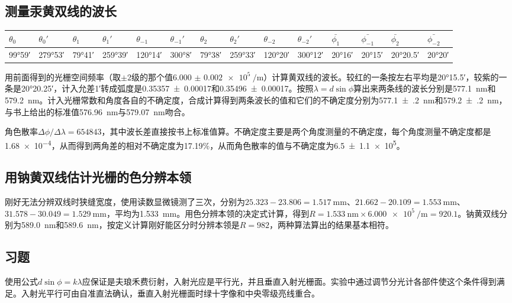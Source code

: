 \documentclass[9pt,UTF8]{ctexart}
\begin{document}
\subsection{测量汞黄双线的波长}

\begin{center}
\noindent
\begin{tabu} to \linewidth {X[c,-10] X[c,-10]|X[c,-10] X[c,-10]|X[c,-10] X[c,-10]|X[c,-10] X[c,-10]|X[c,-10] X[c,-10]||X[c,-10] X[c,-10]|X[c,-10] X[c,-10]}

\hline
$\theta_0$	&$\theta_0'$	&$\theta_1$	&$\theta_1'$	&$\theta_{-1}$&$\theta_{-1}'$	&$\theta_2$	&$\theta_2'$	&$\theta_{-2}$	&$\theta_{-2}'$	&$\bar{\phi_1}$&$\bar{\phi_{-1}}$	&$\bar{\phi_2}$&$\bar{\phi_{-2}}$
\\
\hline
\ang{99;59;}	&\ang{279;53;}	&\ang{79;41;}	&\ang{259;39;}	&\ang{120;14;}	&\ang{300;8;}	&\ang{79;38;}	&\ang{259;33;}	&\ang{120;20;}	&\ang{300;12;}	&\ang{20;16;}	&\ang{20;15;}	&\ang{20;20.5;}	&\ang{20;20;}	
\\
\hline
\end{tabu}
\end{center}
用前面得到的光栅空间频率（取$\pm2$级的那个值$\SI{6.000(2)e5}{\per\meter}$）计算黄双线的波长。较红的一条按左右平均是\ang{20;15.5;}，较紫的一条是\ang{20;20.25;}，计入允差\ang{;1;}转成弧度是\num{.35357(17)}和\num{.35496(17)}。按照$\lambda=d\sin\phi$算出来两条线的波长分别是\SI{577.1}{\nm}和\SI{579.2}{\nm}。计入光栅常数和角度各自的不确定度，合成计算得到两条波长的值和它们的不确定度分别为\SI{577.1(2)}{\nm}和\SI{579.2(2)}{\nm}，与书上给出的标准值\SI{576.96}{\nm}与\SI{579.07}{\nm}吻合。

角色散率$\Delta\phi/\Delta\lambda=\num{654843}$，其中波长差直接按书上标准值算。不确定度主要是两个角度测量的不确定度，每个角度测量不确定度都是\num{1.68e-4}，从而得到两角差的相对不确定度为17.19\%，从而角色散率的值与不确定度为\num{6.5(11)e5}。

\subsection{用钠黄双线估计光栅的色分辨本领}
刚好无法分辨双线时狭缝宽度，使用读数显微镜测了三次，分别为$25.323-23.806=\SI{1.517}{\mm}$、$21.662-20.109=\SI{1.553}{\mm}$、$31.578-30.049=\SI{1.529}{\mm}$，平均为\SI{1.533}{\mm}。用色分辨本领的决定式计算，得到$R=\SI{1.533}{\nm}\times\SI{6.000e5}{\per\meter}=\num{920.1}$。钠黄双线分别为\SI{589.0}{\nm}和\SI{589.6}{\nm}，按定义计算刚好能区分时分辨本领是$R=982$，两种算法算出的结果基本相符。

\subsection{习题}
使用公式$d\sin\phi=k\lambda$应保证是夫琅禾费衍射，入射光应是平行光，并且垂直入射光栅面。实验中通过调节分光计各部件使这个条件得到满足。入射光平行可由自准直法确认，垂直入射光栅面时绿十字像和中央零级亮线重合。
\end{document}
